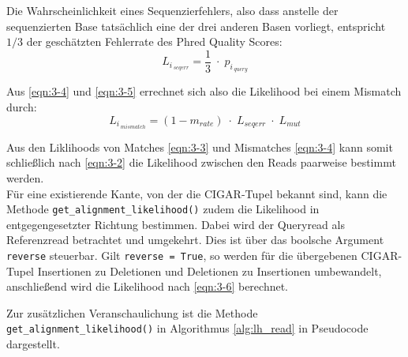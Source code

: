Die Wahrscheinlichkeit eines Sequenzierfehlers, also dass anstelle der sequenzierten Base tatsächlich eine der drei anderen Basen vorliegt, entspricht $ 1/3 $ der geschätzten Fehlerrate des Phred Quality Scores:
\begin{equation} \label{eqn:3-5}
\tag{3-5}
L_{i\,_{seqerr}} = \frac{1}{3} \; \cdotp \; p_{i\,_{query}}
\end{equation}

Aus \eqref{eqn:3-4} und \eqref{eqn:3-5} errechnet sich also die Likelihood bei einem Mismatch durch:
\begin{equation} \label{eqn:3-6}
\tag{3-6}
L_{i\,_{mismatch}} = (1-m_{rate}) \; \cdotp \; L_{seqerr} \; \cdotp \; L_{mut}
\end{equation}

Aus den Liklihoods von Matches \eqref{eqn:3-3} und Mismatches \eqref{eqn:3-4} kann somit schließlich nach \eqref{eqn:3-2} die Likelihood zwischen den Reads paarweise bestimmt werden.\\

Für eine existierende Kante, von der die CIGAR-Tupel bekannt sind, kann die Methode \lstinline|get_alignment_likelihood()| zudem die Likelihood in entgegengesetzter Richtung bestimmen. Dabei wird der Queryread als Referenzread betrachtet und umgekehrt. Dies ist über das boolsche Argument \lstinline{reverse} steuerbar. Gilt \lstinline|reverse = True|, so werden für die übergebenen CIGAR-Tupel Insertionen zu Deletionen und Deletionen zu Insertionen umbewandelt, anschließend wird die Likelihood nach \eqref{eqn:3-6} berechnet.

Zur zusätzlichen Veranschaulichung ist die Methode \lstinline|get_alignment_likelihood()| in Algorithmus \ref{alg:lh_read} in Pseudocode dargestellt.

